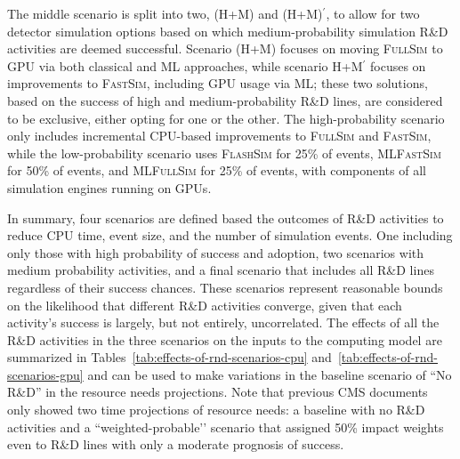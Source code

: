 The middle scenario is split into two, (H+M) and (H+M)$^\prime$, to allow for two detector simulation options based on which medium-probability simulation R\&D activities are deemed successful. Scenario (H+M) focuses on moving \textsc{FullSim} to \gls{GPU} via both classical and \gls{ML} approaches, while scenario H+M$^{\prime}$ focuses on improvements to \textsc{FastSim}, including \gls{GPU} usage via \gls{ML}; these two solutions, based on the success of high and medium-probability R\&D lines, are considered to be exclusive, either opting for one or the other. The high-probability scenario only includes incremental \gls{CPU}-based improvements to \textsc{FullSim} and \textsc{FastSim}, while the low-probability scenario uses \textsc{FlashSim} for 25\% of events, \textsc{MLFastSim} for 50\% of events, and \textsc{MLFullSim} for 25\% of events, with components of all simulation engines running on \glspl{GPU}.

In summary, four scenarios are defined based the outcomes of R\&D activities to reduce \gls{CPU} time, event size, and the number of simulation events. One including only those with high probability of success and adoption, two scenarios with medium probability activities, and a final scenario that includes all R\&D lines regardless of their success chances.
These scenarios represent reasonable bounds on the likelihood that different R\&D activities converge, given that each activity's success is largely, but not entirely, uncorrelated.
The effects of all the R\&D activities in the three scenarios on the inputs to the computing model are summarized in Tables~\ref{tab:effects-of-rnd-scenarios-cpu} and~\ref{tab:effects-of-rnd-scenarios-gpu} and can be used to make variations in the baseline scenario of ``No R\&D'' in the resource needs projections.
Note that previous CMS documents~\cite{Software:2815292} only showed two time projections of resource needs: a baseline with no R\&D activities and a ``weighted-probable’’ scenario that assigned 50\% impact weights even to R\&D lines with only a moderate prognosis of success.


